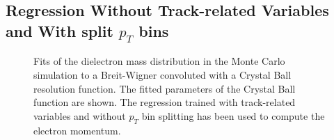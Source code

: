 \documentclass{cmspaper}
\begin{document}
\subsection{Regression Without Track-related Variables and With split $p_{T}$ bins }

\begin{figure}[h]
\centering
	\caption{Fits of the dielectron mass distribution in the Monte Carlo simulation to
        a Breit-Wigner convoluted with a Crystal Ball resolution function. The fitted parameters 
        of the Crystal Ball function are shown. The regression trained with track-related variables
        and without $p_{T}$ bin splitting has been used to compute the electron momentum.}
	\label{fig:ZMassFit_MC_Regression2}
\end{figure}
\end{document}
